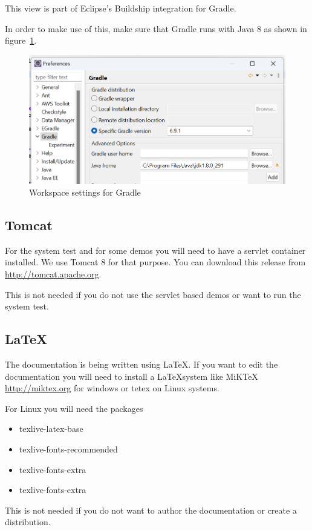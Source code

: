\documentclass[11pt,a4paper]{article}
\begin{document}
This view is part of Eclipse's Buildship integration for Gradle.

In order to make use of this, make sure that Gradle runs with Java 8
as shown in figure~\ref{fig:eclipse-gradle}.
\begin{figure}
\includegraphics[width=\linewidth]{eclipse-gradle.png}
\caption{Workspace settings for Gradle}
\label{fig:eclipse-gradle}
\end{figure}

\subsection{Tomcat}
\label{sec:tomcat}

For the system test and for some demos you will need to have a servlet
container installed. We use Tomcat 8 for that purpose. You can download this
release from \url{http://tomcat.apache.org}.

This is not needed if you do not use the servlet based demos or want to run the
system test.

\subsection{\LaTeX}

The documentation is being written using \LaTeX. If you want to edit the
documentation you will need to install a \LaTeX system like MiKTeX
\url{http://miktex.org} for windows or tetex on Linux systems.

For Linux you will need the packages
\begin{itemize}
  \item texlive-latex-base
  \item texlive-fonts-recommended
  \item texlive-fonts-extra
  \item texlive-fonts-extra
\end{itemize}
This is not needed if you do not want to author the documentation or create a
distribution.
\end{document}
